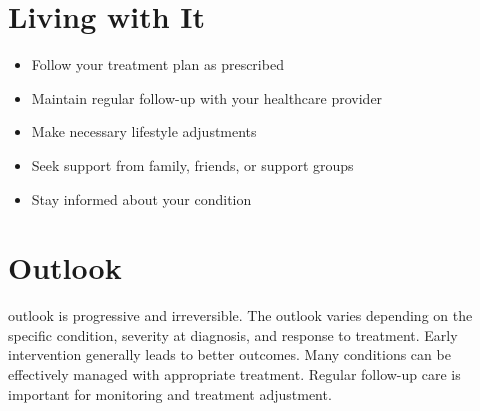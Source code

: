 \section{Living with It}
\begin{itemize}[noitemsep]
  \item Follow your treatment plan as prescribed
  \item Maintain regular follow-up with your healthcare provider
  \item Make necessary lifestyle adjustments
  \item Seek support from family, friends, or support groups
  \item Stay informed about your condition
\end{itemize}
\section{Outlook}
outlook is progressive and irreversible. The outlook varies depending on the specific condition, severity at diagnosis, and response to treatment. Early intervention generally leads to better outcomes. Many conditions can be effectively managed with appropriate treatment. Regular follow-up care is important for monitoring and treatment adjustment.
